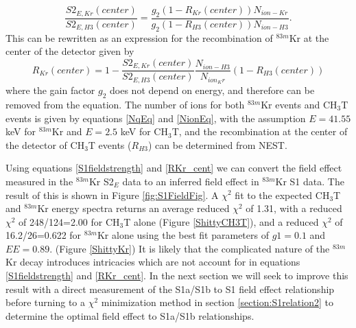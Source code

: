 \begin{equation}
\frac{S2_{E,Kr}(center)}{S2_{E,H3}(center)} = \frac{g_2(1-R_{Kr}(center))N_{ion-Kr}}{g_2(1-R_{H3}(center))N_{ion-H3}}.
\end{equation}
This can be rewritten as an expression for the recombination of $^{83m}$Kr at the center of the detector given by
\begin{equation} \label{RKr_cent}
R_{Kr}(center)=1-\frac{S2_{E,Kr}(center)}{S2_{E,H3}(center)}\frac{N_{ion-H3}}{N_{ion_Kr}}(1-R_{H3}(center))
\end{equation}
where the gain factor $g_2$ does not depend on energy, and therefore can be removed from the equation.  The number of ions for both $^{83m}$Kr events and CH$_3$T events is given by equations \ref{NqEq} and \ref{NionEq}, with the assumption $E=41.55$ keV for $^{83m}$Kr and $E=2.5$ keV for CH$_3$T, and the recombination at the center of the detector of CH$_3$T events ($R_{H3}$) can be determined from NEST.

Using equations \ref{S1fieldstrength} and \ref{RKr_cent} we can convert the field effect measured in the $^{83m}$Kr S2$_E$ data to an inferred field effect in $^{83m}$Kr S1 data.
The result of this is shown in Figure \ref{fig:S1FieldFig}.  A $\chi^2$ fit to the expected CH$_3$T and $^{83m}$Kr energy spectra returns an average reduced $\chi^2$ of 1.31, with a reduced $\chi^2$ of 248/124=2.00 for CH$_3$T alone (Figure \ref{ShittyCH3T}), and a reduced $\chi^2$ of 16.2/26=0.622 for $^{83m}$Kr alone using the best fit parameters of $g1=0.1$ and $EE=0.89$.  (Figure \ref{ShittyKr})  It is likely that the complicated nature of the  $^{83m}$Kr decay introduces intricacies which are not account for in equations \ref{S1fieldstrength} and \ref{RKr_cent}.  In the next section we will seek to improve this result with a direct measurement of the S1a/S1b to S1 field effect relationship before turning to a $\chi^2$ minimization method in section \ref{section:S1relation2} to determine the optimal field effect to S1a/S1b relationships.

